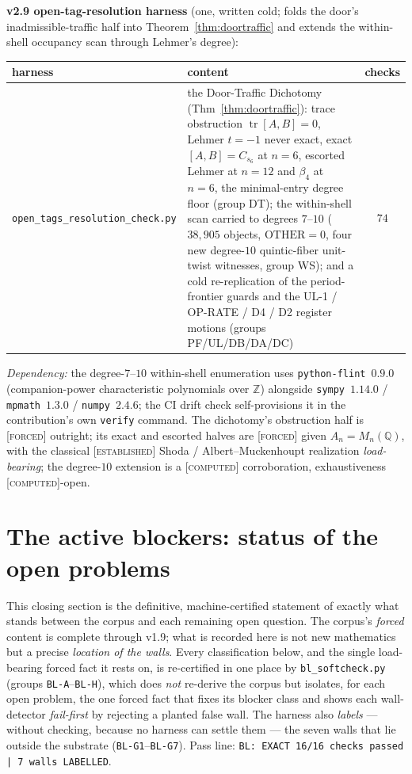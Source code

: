 \documentclass[11pt]{article}
\newcommand{\tagF}{\textcolor{cF}{\textsc{[forced]}}}
\newcommand{\tagC}{\textcolor{cC}{\textsc{[computed]}}}
\newcommand{\tagE}{\textcolor{cE}{\textsc{[established]}}}
\newcommand{\hx}[1]{\textcolor{cC}{\footnotesize\texttt{#1}}}
\newcommand{\Q}{\mathbb{Q}}
\newcommand{\Z}{\mathbb{Z}}
\theoremstyle{plain}
\theoremstyle{definition}
\theoremstyle{remark}
\begin{document}
\smallskip\noindent
\textbf{v2.9 open-tag-resolution harness} (one, written cold; folds the door's
inadmissible-traffic half into Theorem~\ref{thm:doortraffic} and extends the
within-shell occupancy scan through Lehmer's degree):
\begin{center}\footnotesize\setlength{\tabcolsep}{4pt}
\begin{tabular}{@{}lp{10.0cm}c@{}}
\toprule
harness & content & checks\\
\midrule
\texttt{open\_tags\_resolution\_check.py} & the Door-Traffic Dichotomy (Thm~\ref{thm:doortraffic}): trace obstruction $\operatorname{tr}[A,B]{=}0$, Lehmer $t{=}{-}1$ never exact, exact $[A,B]{=}C_{s_6}$ at $n{=}6$, escorted Lehmer at $n{=}12$ and $\beta_4$ at $n{=}6$, the minimal-entry degree floor (group DT); the within-shell scan carried to degrees $7$--$10$ ($38{,}905$ objects, $\mathrm{OTHER}{=}0$, four new degree-$10$ quintic-fiber unit-twist witnesses, group WS); and a cold re-replication of the period-frontier guards and the UL-1 / OP-RATE / D4 / D2 register motions (groups PF/UL/DB/DA/DC) & $74$\\
\bottomrule
\end{tabular}
\end{center}
\emph{Dependency:} the degree-$7$--$10$ within-shell enumeration uses
\texttt{python-flint}~$0.9.0$ (companion-power characteristic polynomials over
$\Z$) alongside \texttt{sympy}~$1.14.0$ / \texttt{mpmath}~$1.3.0$ /
\texttt{numpy}~$2.4.6$; the CI drift check self-provisions it in the contribution's
own \texttt{verify} command. The dichotomy's obstruction half is \tagF{} outright;
its exact and escorted halves are \tagF{} given $A_n=M_n(\Q)$, with the classical
\tagE{} Shoda / Albert--Muckenhoupt realization \emph{load-bearing}; the degree-$10$
extension is a \tagC{} corroboration, exhaustiveness \tagC{}-open.

\section{The active blockers: status of the open problems}\label{sec:blockers}

This closing section is the definitive, machine-certified statement of exactly
what stands between the corpus and each remaining open question. The corpus's
\emph{forced} content is complete through v1.9; what is recorded here is not new
mathematics but a precise \emph{location of the walls}. Every classification
below, and the single load-bearing forced fact it rests on, is re-certified in
one place by \texttt{bl\_softcheck.py} (groups \hx{BL-A}--\hx{BL-H}), which does
\emph{not} re-derive the corpus but isolates, for each open problem, the one
forced fact that fixes its blocker class and shows each wall-detector
\emph{fail-first} by rejecting a planted false wall. The harness also
\emph{labels} --- without checking, because no harness can settle them --- the
seven walls that lie outside the substrate (\hx{BL-G1}--\hx{BL-G7}). Pass line:
\texttt{BL: EXACT 16/16 checks passed | 7 walls LABELLED}.
\end{document}
